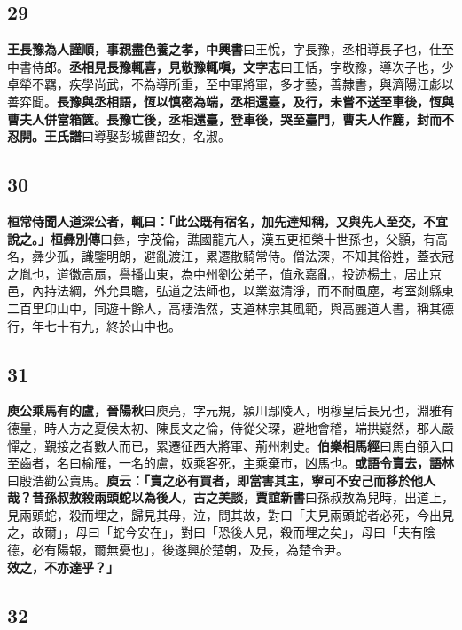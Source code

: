 \subsection*{29}

\textbf{王長豫為人謹順，事親盡色養之孝，}{\footnotesize \textbf{中興書}曰王悅，字長豫，丞相導長子也，仕至中書侍郎。}\textbf{丞相見長豫輒喜，見敬豫輒嗔，}{\footnotesize \textbf{文字志}曰王恬，字敬豫，導次子也，少卓犖不羈，疾學尚武，不為導所重，至中軍將軍，多才藝，善隸書，與濟陽江虨以善弈聞。}\textbf{長豫與丞相語，恆以慎密為端，丞相還臺，及行，未嘗不送至車後，恆與曹夫人併當箱篋。長豫亡後，丞相還臺，登車後，哭至臺門，曹夫人作簏，封而不忍開。}{\footnotesize \textbf{王氏譜}曰導娶彭城曹韶女，名淑。}

\subsection*{30}

\textbf{桓常侍聞人道深公者，輒曰：「此公既有宿名，加先達知稱，又與先人至交，不宜說之。」}{\footnotesize \textbf{桓彝別傳}曰彝，字茂倫，譙國龍亢人，漢五更桓榮十世孫也，父顥，有高名，彝少孤，識鑒明朗，避亂渡江，累遷散騎常侍。僧法深，不知其俗姓，蓋衣冠之胤也，道徽高扇，譽播山東，為中州劉公弟子，值永嘉亂，投迹楊土，居止京邑，內持法綱，外允具瞻，弘道之法師也，以業滋清淨，而不耐風塵，考室剡縣東二百里卬山中，同遊十餘人，高棲浩然，支道林宗其風範，與高麗道人書，稱其德行，年七十有九，終於山中也。}

\subsection*{31}

\textbf{庾公乘馬有的盧，}{\footnotesize \textbf{晉陽秋}曰庾亮，字元規，潁川鄢陵人，明穆皇后長兄也，淵雅有德量，時人方之夏侯太初、陳長文之倫，侍從父琛，避地會稽，端拱嶷然，郡人嚴憚之，覲接之者數人而已，累遷征西大將軍、荊州刺史。\textbf{伯樂相馬經}曰馬白頟入口至齒者，名曰榆雁，一名的盧，奴乘客死，主乘棄市，凶馬也。}\textbf{或語令賣去，}{\footnotesize \textbf{語林}曰殷浩勸公賣馬。}\textbf{庾云：「賣之必有買者，即當害其主，寧可不安己而移於他人哉？昔孫叔敖殺兩頭蛇以為後人，古之美談，}{\footnotesize \textbf{賈誼新書}曰孫叔敖為兒時，出道上，見兩頭蛇，殺而埋之，歸見其母，泣，問其故，對曰「夫見兩頭蛇者必死，今出見之，故爾」，母曰「蛇今安在」，對曰「恐後人見，殺而埋之矣」，母曰「夫有陰德，必有陽報，爾無憂也」，後遂興於楚朝，及長，為楚令尹。}\textbf{效之，不亦達乎？」}

\subsection*{32}

